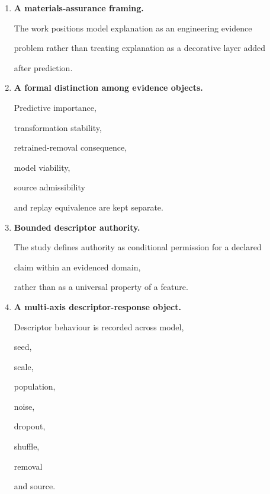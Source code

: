 \documentclass[11pt,a4paper,oneside]{report}
\begin{document}
\begin{enumerate}



\item

\textbf{A materials-assurance framing.}



The work positions model explanation as an engineering evidence

problem rather than treating explanation as a decorative layer added

after prediction.



\item

\textbf{A formal distinction among evidence objects.}



Predictive importance,

transformation stability,

retrained-removal consequence,

model viability,

source admissibility

and replay equivalence are kept separate.



\item

\textbf{Bounded descriptor authority.}



The study defines authority as conditional permission for a declared

claim within an evidenced domain,

rather than as a universal property of a feature.



\item

\textbf{A multi-axis descriptor-response object.}



Descriptor behaviour is recorded across model,

seed,

scale,

population,

noise,

dropout,

shuffle,

removal

and source.




\end{enumerate}
\end{document}
